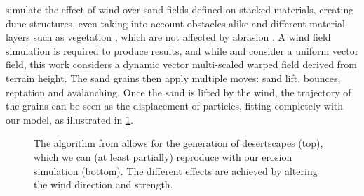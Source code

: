 \cite{Paris2019b} simulate the effect of wind over sand fields defined on stacked materials, creating dune structures, even taking into account obstacles alike \cite{Roa2004} and different material layers such as vegetation \cite{Cordonnier2017a}, which are not affected by abrasion \cite{Paris2019b}. A wind field simulation is required to produce results, and while \cite{Roa2004} and \cite{Onoue2000} consider a uniform vector field, this work considers a dynamic vector multi-scaled warped field derived from terrain height. The sand grains then apply multiple moves: sand lift, bounces, reptation and avalanching. Once the sand is lifted by the wind, the trajectory of the grains can be seen as the displacement of particles, fitting completely with our model, as illustrated in \cref{fig:erosion-screen-paris2020}.

\begin{figure}[H]
    \caption[Comparison of desertscape erosion with \cite{Paris2019b}]{The algorithm from \cite{Paris2019b} allows for the generation of desertscapes (top), which we can (at least partially) reproduce with our erosion simulation (bottom). The different effects are achieved by altering the wind direction and strength.}
    \label{fig:erosion-screen-paris2020}
\end{figure}






